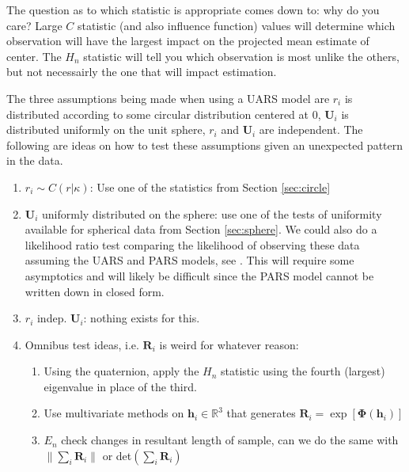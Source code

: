 \documentclass{article}\usepackage{graphicx, color}
\newcommand{\R}{{\mathbb{R}}}
\begin{document}
The question as to which statistic is appropriate comes down to: why do you care?  Large $C$ statistic (and also influence function) values will determine which observation will have the largest impact on the projected mean estimate of center.  The $H_n$ statistic will tell you which observation is most unlike the others, but not necessairly the one that will impact estimation.

The three assumptions being made when using a UARS model are $r_i$ is distributed according to some circular distribution centered at $0$, $\bm U_i$ is distributed uniformly on the unit sphere, $r_i$ and $\bm U_i$ are independent.  The following are ideas on how to test these assumptions given an unexpected pattern in the data.
\begin{enumerate}
\item $r_i\sim C(r|\kappa)$: Use one of the statistics from Section \ref{sec:circle}
\item $\bm U_i$ uniformly distributed on the sphere:  use one of the tests of uniformity available for spherical data from Section \ref{sec:sphere}.  We could also do a likelihood ratio test comparing the likelihood of observing these data assuming the UARS and PARS models, see  \cite{bingham2012}.  This will require some asymptotics and will likely be difficult since the PARS model cannot be written down in closed form.
\item $r_i$ indep. $\bm U_i$: nothing exists for this.  
\item Omnibus test ideas, i.e. $\bm R_i$ is weird for whatever reason:
\begin{enumerate}
\item Using the quaternion, apply the $H_n$ statistic using the fourth (largest) eigenvalue in place of the third.
\item Use multivariate methods on $\bm h_i\in\R^3$ that generates $\bm R_i=\exp[\bm{\Phi}(\bm h_i)]$
\item $E_n$ check changes in resultant length of sample, can we do the same with $\|\sum_i\bm R_i\|$ or det$(\sum_i \bm R_i)$
\end{enumerate}
\end{enumerate}


\end{document}
